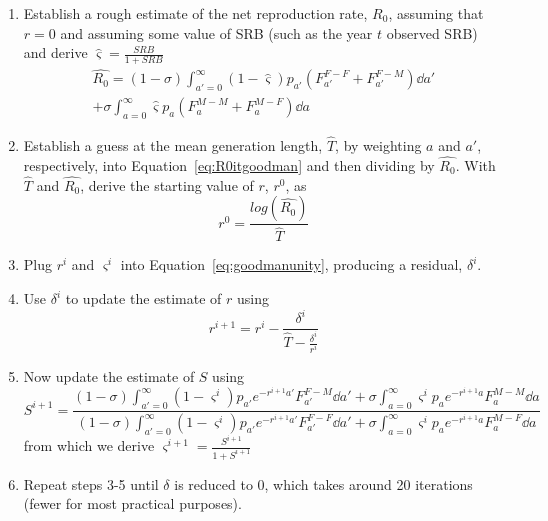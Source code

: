 \begin{enumerate}
  \item Establish a rough estimate of the net reproduction rate, $R_0$, assuming
  that $r = 0$ and assuming some value of SRB (such as the year $t$ observed
  SRB) and derive $\hat{\varsigma} = \frac{SRB}{1 + SRB}$
  \begin{equation}
  \label{eq:R0itgoodman}
  \begin{split}
\widehat{R_0} = (1-\sigma) \int_{a'=0}^\infty (1-\hat{\varsigma})
p_{a'}(F_{a'}^{F-F}+F_{a'}^{F-M}) \dd a' \\ + \sigma  \int_{a=0}^\infty
\hat{\varsigma} p_a(F_a^{M-M}+F_a^{M-F}) \dd a
\end{split}
  \end{equation}
  \item Establish a guess at the mean generation length, $\widehat{T}$, by
  weighting $a$ and $a'$, respectively, into Equation~\eqref{eq:R0itgoodman} and
  then dividing by $\widehat{R_0}$. With $\widehat{T}$ and $\widehat{R_0}$,
  derive the starting value of $r$, $r^{0}$, as
  \begin{equation}
  r^{0} = \frac{log(\widehat{R_0})}{\widehat{T}}
  \end{equation}
  \item Plug $r^{i}$ and $\varsigma^i$ into
  Equation~\eqref{eq:goodmanunity}, producing a residual, $\delta^{i}$.
  \item Use $\delta^{i}$ to update the estimate of $r$ using
   \begin{equation}
  r^{i+1} = r^i - \frac{\delta^i}{\widehat{T} - \frac{\delta^i}{r^i}}
  \end{equation}
  \item Now update the estimate of $S$ using
   \begin{equation}
        S^{i+1} = \frac{(1-\sigma) \int_{a'=0}^\infty
         (1-\varsigma^i)p_{a'}e^{-r^{i+1}a'} F_{a'}^{F-M} \dd a' + 
         \sigma  \int_{a=0}^\infty \varsigma^i p_ae^{-r^{i+1}a} F_a^{M-M} \dd
         a}{ (1-\sigma) \int_{a'=0}^\infty
         (1-\varsigma^i)p_{a'}e^{-r^{i+1}a'} F_{a'}^{F-F} \dd a' + 
         \sigma  \int_{a=0}^\infty \varsigma^i p_ae^{-r^{i+1}a} F_a^{M-F} \dd a}
  \end{equation}
  from which we derive $\varsigma^{i+1} = \frac{S^{i+1}}{1+S^{i+1}}$
  \item Repeat steps 3-5 until $\delta$ is reduced to 0, which takes around 20
  iterations (fewer for most practical purposes).
\end{enumerate}

